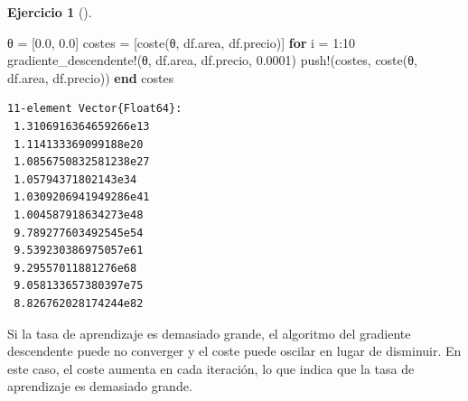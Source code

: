\documentclass[
  a4paper,
]{scrreport}
\newenvironment{Shaded}{\begin{snugshade}}{\end{snugshade}}
\newcommand{\ControlFlowTok}[1]{\textcolor[rgb]{0.00,0.23,0.31}{\textbf{#1}}}
\newcommand{\FloatTok}[1]{\textcolor[rgb]{0.68,0.00,0.00}{#1}}
\newcommand{\FunctionTok}[1]{\textcolor[rgb]{0.28,0.35,0.67}{#1}}
\newcommand{\NormalTok}[1]{\textcolor[rgb]{0.00,0.23,0.31}{#1}}
\newcommand{\OperatorTok}[1]{\textcolor[rgb]{0.37,0.37,0.37}{#1}}
\theoremstyle{definition}
\newtheorem{exercise}{Ejercicio}[chapter]
\theoremstyle{remark}
\begin{document}
\begin{exercise}[]
\begin{enumerate}
  \begin{tcolorbox}[enhanced jigsaw, toprule=.15mm, arc=.35mm, toptitle=1mm, colbacktitle=quarto-callout-tip-color!10!white, opacityback=0, left=2mm, colback=white, colframe=quarto-callout-tip-color-frame, rightrule=.15mm, breakable, leftrule=.75mm, coltitle=black, opacitybacktitle=0.6, titlerule=0mm, bottomtitle=1mm, title=\textcolor{quarto-callout-tip-color}{\faLightbulb}\hspace{0.5em}{Solución}, bottomrule=.15mm]

\begin{Shaded}
\begin{Highlighting}[]
\NormalTok{θ }\OperatorTok{=}\NormalTok{ [}\FloatTok{0.0}\NormalTok{, }\FloatTok{0.0}\NormalTok{]}
\NormalTok{costes }\OperatorTok{=}\NormalTok{ [}\FunctionTok{coste}\NormalTok{(θ, df.area, df.precio)]}
\ControlFlowTok{for}\NormalTok{ i }\OperatorTok{=} \FloatTok{1}\OperatorTok{:}\FloatTok{10}
    \FunctionTok{gradiente\_descendente!}\NormalTok{(θ, df.area, df.precio, }\FloatTok{0.0001}\NormalTok{)}
    \FunctionTok{push!}\NormalTok{(costes, }\FunctionTok{coste}\NormalTok{(θ, df.area, df.precio))}
\ControlFlowTok{end}
\NormalTok{costes}
\end{Highlighting}
\end{Shaded}

\begin{verbatim}
11-element Vector{Float64}:
 1.3106916364659266e13
 1.114133369099188e20
 1.0856750832581238e27
 1.05794371802143e34
 1.0309206941949286e41
 1.004587918634273e48
 9.789277603492545e54
 9.539230386975057e61
 9.29557011881276e68
 9.058133657380397e75
 8.826762028174244e82
\end{verbatim}

  Si la tasa de aprendizaje es demasiado grande, el algoritmo del
  gradiente descendente puede no converger y el coste puede oscilar en
  lugar de disminuir. En este caso, el coste aumenta en cada iteración,
  lo que indica que la tasa de aprendizaje es demasiado grande.

  \end{tcolorbox}
\end{enumerate}

\end{exercise}
\end{document}
